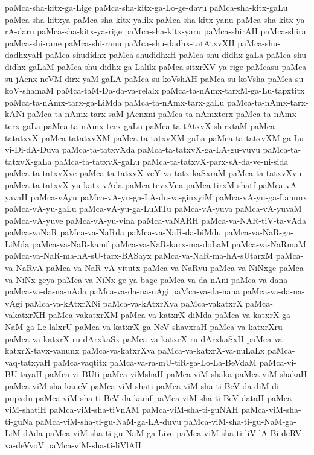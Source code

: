 {paMca-sha-kitx-ga-Lige
paMca-sha-kitx-ga-Lo-ge-davu
paMca-sha-kitx-gaLu
paMca-sha-kitxya
paMca-sha-kitx-yalilx
paMca-sha-kitx-yanu
paMca-sha-kitx-ya-rA-daru
paMca-sha-kitx-ya-rige
paMca-sha-kitx-yaru
paMca-shirAH
paMca-shira
paMca-shi-rane
paMca-shi-ranu
paMca-shu-dadhx-tatAtxvXH
paMca-shu-dadhxyaH
paMca-shudidhx
paMca-shudidhxH
paMca-shu-didhx-gaLa
paMca-shu-didhx-gaLaM
paMca-shu-didhx-ga-Lalilx
paMca-sitxrXV-ya-rige
paMcasu
paMca-su-jAcnx-neVM-dirx-yaM-gaLA
paMca-su-koVshAH
paMca-su-koVsha
paMca-su-koV-shamaM
paMca-taM-Da-da-va-relalx
paMca-ta-nAmx-tarxM-ga-Lu-tapxtitx
paMca-ta-nAmx-tarx-ga-LiMda
paMca-ta-nAmx-tarx-gaLu
paMca-ta-nAmx-tarx-kANi
paMca-ta-nAmx-tarx-saM-jAcnxni
paMca-ta-nAmxterx
paMca-ta-nAmx-terx-gaLa
paMca-ta-nAmx-terx-gaLu
paMca-ta-tAtxvX-shirxtaM
paMca-tatatxvX
paMca-tatatxvXM
paMca-ta-tatxvXM-gaLa
paMca-ta-tatxvXM-ga-Lu-vi-Di-dA-Duva
paMca-ta-tatxvXda
paMca-ta-tatxvX-ga-LA-gu-vuvu
paMca-ta-tatxvX-gaLa
paMca-ta-tatxvX-gaLu
paMca-ta-tatxvX-parx-sA-da-ve-ni-sida
paMca-ta-tatxvXve
paMca-ta-tatxvX-veY-va-tatx-kaSxraM
paMca-ta-tatxvXvu
paMca-ta-tatxvX-yu-katx-vAda
paMca-tevxVna
paMca-tirxM-shatf
paMca-vA-yavaH
paMca-vAyu
paMca-vA-yu-ga-LA-du-va-ginxyiM
paMca-vA-yu-ga-Lanunx
paMca-vA-yu-gaLu
paMca-vA-yu-ga-LuMTu
paMca-vA-yuva
paMca-vA-yuvaM
paMca-vA-yuve
paMca-vA-yu-vina
paMca-vaNARH
paMca-va-NAR-tiV-ta-vAda
paMca-vaNaR
paMca-va-NaRda
paMca-va-NaR-da-biMdu
paMca-va-NaR-ga-LiMda
paMca-va-NaR-kamf
paMca-va-NaR-karx-ma-doLaM
paMca-va-NaRmaM
paMca-va-NaR-ma-hA-sU-tarx-BASayx
paMca-va-NaR-ma-hA-sUtarxM
paMca-va-NaRvA
paMca-va-NaR-vA-yitutx
paMca-va-NaRvu
paMca-va-NiNxge
paMca-va-NiNx-geya
paMca-va-NiNx-ge-ya-bage
paMca-va-da-nAni
paMca-va-dana
paMca-va-da-na-nAda
paMca-va-da-na-nAgi
paMca-va-da-nana
paMca-va-da-na-vAgi
paMca-va-kAtxrXNi
paMca-va-kAtxrXya
paMca-vakatxrX
paMca-vakatxrXH
paMca-vakatxrXM
paMca-va-katxrX-diMda
paMca-va-katxrX-ga-NaM-ga-Le-lalxrU
paMca-va-katxrX-ga-NeV-shavxraH
paMca-va-katxrXru
paMca-va-katxrX-ru-dArxkaSx
paMca-va-katxrX-ru-dArxkaSxH
paMca-va-katxrX-tavx-vanunx
paMca-va-katxrXva
paMca-va-katxrX-va-nuLaLx
paMca-vaq-tatxyaH
paMca-vaqtitx
paMca-va-ra-mU-tiR-ga-Lo-La-BeVdaM
paMca-vi-BU-tayaH
paMca-vi-BUti
paMca-viMshaH
paMca-viM-shaka
paMca-viM-shakaH
paMca-viM-sha-kaneV
paMca-viM-shati
paMca-viM-sha-ti-BeV-da-diM-di-pupxdu
paMca-viM-sha-ti-BeV-da-kamf
paMca-viM-sha-ti-BeV-dataH
paMca-viM-shatiH
paMca-viM-sha-tiVnAM
paMca-viM-sha-ti-guNAH
paMca-viM-sha-ti-guNa
paMca-viM-sha-ti-gu-NaM-ga-LA-duvu
paMca-viM-sha-ti-gu-NaM-ga-LiM-dAda
paMca-viM-sha-ti-gu-NaM-ga-Live
paMca-viM-sha-ti-liV-lA-Bi-deRV-va-deVvoV
paMca-viM-sha-ti-liVlAH
}
